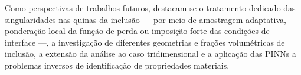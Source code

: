 \documentclass[brazil]{TCAM} %
\begin{document}
Como perspectivas de trabalhos futuros, destacam-se o tratamento dedicado das singularidades nas quinas da inclusão — por meio de amostragem adaptativa, ponderação local da função de perda ou imposição forte das condições de interface \cite{sukumar2022exact} —, a investigação de diferentes geometrias e frações volumétricas de inclusão, a extensão da análise ao caso tridimensional e a aplicação das PINNs a problemas inversos de identificação de propriedades materiais.



\end{document}
